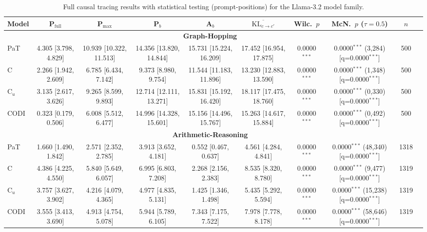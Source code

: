 \begin{table}[h!]
\centering
\tiny
\setlength{\tabcolsep}{2.5pt}
\begin{tabular}{l ccc c cc cc r}
\toprule
Model & P$_{\text{full}}$ & P$_{\max}$ & P$_b$ & A$_b$ & $\overline{\text{KL}_{c\to c'}}$ & Wilc.\ $p$ & McN.\ $p$ ($\tau{=}0.5$) & $n$ \\
\midrule
\multicolumn{9}{c}{\textbf{Graph-Hopping}} \\
\midrule
PaT & 4.305 [3.798, 4.829] & 10.939 [10.322, 11.513] & 14.356 [13.820, 14.844] & 15.731 [15.224, 16.209] & 17.452 [16.954, 17.875] & 0.0000$^{***}$ & 0.0000$^{***}$ (3,284) [q=0.0000$^{***}$] & 500 \\
C & 2.266 [1.942, 2.609] & 6.785 [6.434, 7.142] & 9.373 [8.980, 9.754] & 11.544 [11.183, 11.896] & 13.230 [12.883, 13.590] & 0.0000$^{***}$ & 0.0000$^{***}$ (1,348) [q=0.0000$^{***}$] & 500 \\
C$_u$ & 3.135 [2.617, 3.626] & 9.265 [8.599, 9.893] & 12.714 [12.111, 13.271] & 15.831 [15.192, 16.420] & 18.117 [17.475, 18.760] & 0.0000$^{***}$ & 0.0000$^{***}$ (0,330) [q=0.0000$^{***}$] & 500 \\
CODI & 0.323 [0.179, 0.506] & 6.008 [5.512, 6.477] & 14.996 [14.328, 15.601] & 15.156 [14.496, 15.767] & 15.263 [14.617, 15.884] & 0.0000$^{***}$ & 0.0000$^{***}$ (0,492) [q=0.0000$^{***}$] & 500 \\
\midrule
\multicolumn{9}{c}{\textbf{Arithmetic-Reasoning}} \\
\midrule
PaT & 1.660 [1.490, 1.842] & 2.571 [2.352, 2.785] & 3.913 [3.652, 4.181] & 0.552 [0.467, 0.637] & 4.561 [4.284, 4.841] & 0.0000$^{***}$ & 0.0000$^{***}$ (48,340) [q=0.0000$^{***}$] & 1318 \\
C & 4.386 [4.225, 4.550] & 5.840 [5.649, 6.057] & 6.995 [6.803, 7.208] & 2.268 [2.156, 2.383] & 8.535 [8.320, 8.780] & 0.0000$^{***}$ & 0.0000$^{***}$ (9,477) [q=0.0000$^{***}$] & 1319 \\
C$_u$ & 3.757 [3.627, 3.902] & 4.216 [4.079, 4.365] & 4.977 [4.835, 5.131] & 1.425 [1.346, 1.498] & 5.435 [5.292, 5.594] & 0.0000$^{***}$ & 0.0000$^{***}$ (15,238) [q=0.0000$^{***}$] & 1319 \\
CODI & 3.555 [3.413, 3.690] & 4.913 [4.754, 5.078] & 5.944 [5.789, 6.105] & 7.343 [7.175, 7.522] & 7.978 [7.778, 8.178] & 0.0000$^{***}$ & 0.0000$^{***}$ (58,646) [q=0.0000$^{***}$] & 1319 \\
\bottomrule
\end{tabular}
\caption{Full causal tracing results with statistical testing (prompt-positions) for the Llama-3.2 model family.}
\label{tab:causal_trace_prompt_llama}
\end{table}

